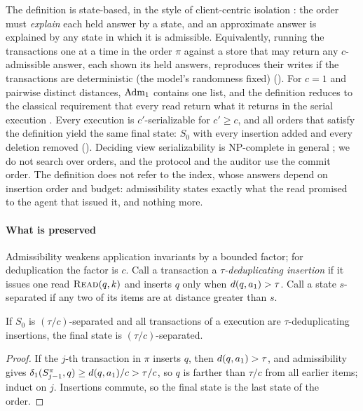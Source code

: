 \documentclass[sigconf, nonacm, review]{acmart}
\begin{document}
The definition is state-based, in the style of client-centric isolation
\cite{DBLP:conf/podc/CrooksPAC17,DBLP:conf/concur/CeroneBG15}: the order must \emph{explain} each held answer by
a state, and an approximate answer is explained by any state in which
it is admissible. Equivalently, running the transactions one at a time
in the order $\pi$ against a store that may return any $c$-admissible
answer, each shown its held answers, reproduces their writes if the
transactions are deterministic (the model's randomness fixed)
(\appProofs). For $c=1$ and pairwise distinct distances, $\mathrm{Adm}_1$ contains one
list, and the definition reduces to the classical requirement that
every read return what it returns in the serial execution
\cite{DBLP:journals/jacm/Papadimitriou79,DBLP:books/aw/BernsteinHG87}. Every \cser{} execution is
$c'$-serializable for $c'\ge c$, and all orders that satisfy the
definition yield the same final state: $S_0$ with every insertion added
and every deletion removed (\appProofs). Deciding view serializability
is NP-complete in general \cite{DBLP:journals/jacm/Papadimitriou79};
we do not search over orders, and the protocol and the auditor use the
commit order. The definition does not refer to the index, whose answers
depend on insertion order and budget: admissibility
states exactly what the read promised to the agent that issued it, and nothing more.

\paragraph{What is preserved}
Admissibility weakens application invariants by a bounded factor;
for deduplication the factor is $c$. Call a transaction a \emph{$\tau$-deduplicating insertion} if it issues
one read $\textsc{Read}(q,k)$ and inserts $q$ only when $d(q,a_1)>\tau$. Call a
state $s$-separated if any two of its items are at distance greater
than $s$.

\begin{proposition}[Separation]
\label{prop:sep}
If $S_0$ is $(\tau/c)$-separated and all transactions of a \cser{}
execution are $\tau$-deduplicating insertions, the final state is
$(\tau/c)$-separated.
\end{proposition}
\begin{proof}
If the $j$-th transaction in $\pi$ inserts $q$, then
$d(q,a_1)>\tau$, and admissibility gives
$\delta_1(S^\pi_{j-1},q)\ge d(q,a_1)/c>\tau/c$, so $q$ is farther than $\tau/c$ from all earlier items; induct on $j$.
Insertions commute, so the final state is the last state of the order.
\end{proof}
\end{document}
